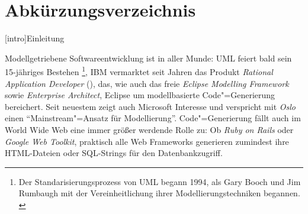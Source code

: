 \documentclass[11pt, a4paper, bibgerm]{scrbook}
\newcommand\lchapter{}
\newcommand{\cgen}{Code"=Generierung}
\begin{document}
\chapter*{Abkürzungsverzeichnis}
\begin{acronym}
\end{acronym}



\lchapter[intro]{Einleitung}


Modellgetriebene Softwareentwicklung ist in aller Munde: UML\cite{UML}
feiert bald sein 15-jähriges Bestehen \footnote{Der
  Standarisierungsprozess von UML begann 1994, als Gary Booch und Jim
  Rumbaugh mit der Vereinheitlichung ihrer Modellierungstechniken
  begannen. \cite[S. 17]{UML}}, IBM vermarktet seit Jahren das Produkt
\textit{Rational Application Developer} (\cite{RAD}), das, wie auch das freie
\textit{Eclipse Modelling Framework} sowie \textit{Enterprise
  Architect}, Eclipse um modellbasierte \cgen{}
bereichert. Seit neuestem zeigt auch Microsoft Interesse und
verspricht mit \textit{Oslo} \cite{Oslo} einen ``Mainstream"=Ansatz
für Modellierung''. \cgen{} fällt auch im World Wide Web eine
immer größer werdende Rolle zu: Ob \textit{Ruby on Rails} oder
\textit{Google Web Toolkit}, praktisch alle Web Frameworks generieren
zumindest ihre HTML-Dateien oder SQL-Strings für den Datenbankzugriff.
\end{document}
